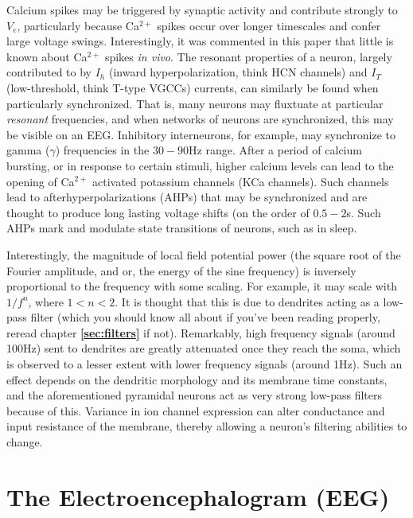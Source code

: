     Calcium spikes may be triggered by synaptic activity and contribute strongly to $V_e$, particularly because Ca$^{2+}$ spikes occur over longer timescales and confer large voltage swings. Interestingly, it was commented in this paper that little is known about Ca$^{2+}$ spikes \textit{in vivo}. The resonant properties of a neuron, largely contributed to by $I_h$ (inward hyperpolarization, think HCN channels) and $I_T$ (low-threshold, think T-type VGCCs) currents, can similarly be found when particularly synchronized. That is, many neurons may fluxtuate at particular \textit{resonant} frequencies, and when networks of neurons are synchronized, this may be visible on an EEG. Inhibitory interneurons, for example, may synchronize to gamma ($\gamma$) frequencies in the $30-90$Hz range. After a period of calcium bursting, or in response to certain stimuli, higher calcium levels can lead to the opening of Ca$^{2+}$ activated potassium channels (KCa channels). Such channels lead to afterhyperpolarizations (AHPs) that may be synchronized and are thought to produce long lasting voltage shifts (on the order of $0.5-2$s. Such AHPs mark and modulate state transitions of neurons, such as in sleep.\newline

    Interestingly, the magnitude of local field potential power (the square root of the Fourier amplitude, and or, the energy of the sine frequency) is inversely proportional to the frequency with some scaling. For example, it may scale with $1/f^n$, where $1 < n < 2$. It is thought that this is due to dendrites acting as a low-pass filter (which you should know all about if you've been reading properly, reread chapter \textbf{\ref{sec:filters}} if not). Remarkably, high frequency signals (around 100Hz) sent to dendrites are greatly attenuated once they reach the soma, which is observed to a lesser extent with lower frequency signals (around 1Hz). Such an effect depends on the dendritic morphology and its membrane time constants, and the aforementioned pyramidal neurons act as very strong low-pass filters because of this. Variance in ion channel expression can alter conductance and input resistance of the membrane, thereby allowing a neuron's filtering abilities to change.\newline

    







\section{The Electroencephalogram (EEG)}


